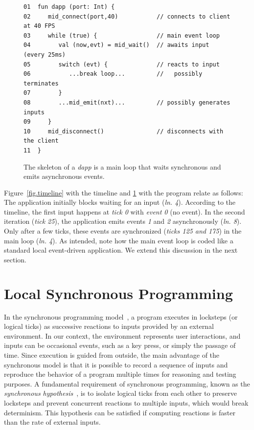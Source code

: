 \documentclass[sigplan,screen]{acmart}
\newcommand{\lin}[1]{(\emph{ln. #1}\xspace)}
\newcommand{\dapp}{\emph{dapp}\xspace}
\begin{document}
\begin{figure}[t]
{\scriptsize
\begin{verbatim}
01  fun dapp (port: Int) {
02     mid_connect(port,40)           // connects to client at 40 FPS
03     while (true) {                 // main event loop
04        val (now,evt) = mid_wait()  // awaits input (every 25ms)
05        switch (evt) {              // reacts to input
06           ...break loop...         //   possibly terminates
07        }
08        ...mid_emit(nxt)...         // possibly generates inputs
09     }
10     mid_disconnect()               // disconnects with the client
11  }
\end{verbatim}
}
  \caption{
    \label{fig.skel}
    The skeleton of a \dapp is a main loop that waits synchronous and emits
    asynchronous events.
  }
\end{figure}

Figure~\ref{fig.timeline} with the timeline and \ref{fig.skel} with the program
relate as follows:
The application initially blocks waiting for an input \lin{4}.
According to the timeline, the first input happens at \emph{tick 0} with
\emph{event 0} (no event).
In the second iteration (\emph{tick 25}), the application emits events \emph{1}
and \emph{2} asynchronously \lin{8}.
Only after a few ticks, these events are synchronized (\emph{ticks 125 and 175})
in the main loop \lin{4}.
As intended, note how the main event loop is coded like a standard local
event-driven application.
We extend this discussion in the next section.

\section{Local Synchronous Programming}
\label{sec.sync}

In the synchronous programming model~\cite{sync}, a program executes in
locksteps (or logical ticks) as successive reactions to inputs provided by an
external environment.
In our context, the environment represents user interactions, and inputs can be
occasional events, such as a key press, or simply the passage of time.
Since execution is guided from outside, the main advantage of the synchronous
model is that it is possible to record a sequence of inputs and reproduce the
behavior of a program multiple times for reasoning and testing purposes.
A fundamental requirement of synchronous programming, known as the
\emph{synchronous hypothesis}~\cite{hypo}, is to isolate logical ticks from
each other to preserve locksteps and prevent concurrent reactions to multiple
inputs, which would break determinism.
This hypothesis can be satisfied if computing reactions is faster than the rate
of external inputs.
\end{document}
